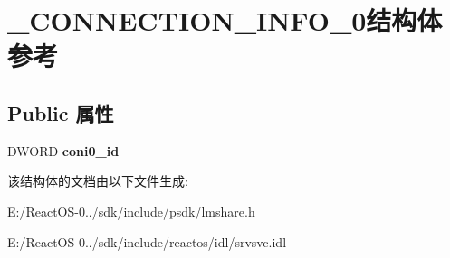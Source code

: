 \hypertarget{struct___c_o_n_n_e_c_t_i_o_n___i_n_f_o__0}{}\section{\+\_\+\+C\+O\+N\+N\+E\+C\+T\+I\+O\+N\+\_\+\+I\+N\+F\+O\+\_\+0结构体 参考}
\label{struct___c_o_n_n_e_c_t_i_o_n___i_n_f_o__0}
\subsection*{Public 属性}
\begin{DoxyCompactItemize}
\item 
\mbox{\label{struct___c_o_n_n_e_c_t_i_o_n___i_n_f_o__0_a0420c4dea32df60f0f2e6cd8d398131a}} 
D\+W\+O\+RD {\bfseries coni0\+\_\+id}
\end{DoxyCompactItemize}


该结构体的文档由以下文件生成\+:\begin{DoxyCompactItemize}
\item 
E\+:/\+React\+O\+S-\/0../sdk/include/psdk/lmshare.\+h\item 
E\+:/\+React\+O\+S-\/0../sdk/include/reactos/idl/srvsvc.\+idl\end{DoxyCompactItemize}
